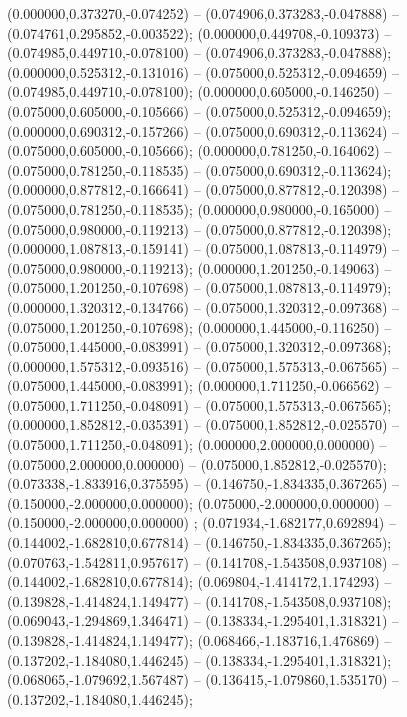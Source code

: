  (0.000000,0.373270,-0.074252) -- (0.074906,0.373283,-0.047888) -- (0.074761,0.295852,-0.003522);
 (0.000000,0.449708,-0.109373) -- (0.074985,0.449710,-0.078100) -- (0.074906,0.373283,-0.047888);
 (0.000000,0.525312,-0.131016) -- (0.075000,0.525312,-0.094659) -- (0.074985,0.449710,-0.078100);
 (0.000000,0.605000,-0.146250) -- (0.075000,0.605000,-0.105666) -- (0.075000,0.525312,-0.094659);
 (0.000000,0.690312,-0.157266) -- (0.075000,0.690312,-0.113624) -- (0.075000,0.605000,-0.105666);
 (0.000000,0.781250,-0.164062) -- (0.075000,0.781250,-0.118535) -- (0.075000,0.690312,-0.113624);
 (0.000000,0.877812,-0.166641) -- (0.075000,0.877812,-0.120398) -- (0.075000,0.781250,-0.118535);
 (0.000000,0.980000,-0.165000) -- (0.075000,0.980000,-0.119213) -- (0.075000,0.877812,-0.120398);
 (0.000000,1.087813,-0.159141) -- (0.075000,1.087813,-0.114979) -- (0.075000,0.980000,-0.119213);
 (0.000000,1.201250,-0.149063) -- (0.075000,1.201250,-0.107698) -- (0.075000,1.087813,-0.114979);
 (0.000000,1.320312,-0.134766) -- (0.075000,1.320312,-0.097368) -- (0.075000,1.201250,-0.107698);
 (0.000000,1.445000,-0.116250) -- (0.075000,1.445000,-0.083991) -- (0.075000,1.320312,-0.097368);
 (0.000000,1.575312,-0.093516) -- (0.075000,1.575313,-0.067565) -- (0.075000,1.445000,-0.083991);
 (0.000000,1.711250,-0.066562) -- (0.075000,1.711250,-0.048091) -- (0.075000,1.575313,-0.067565);
 (0.000000,1.852812,-0.035391) -- (0.075000,1.852812,-0.025570) -- (0.075000,1.711250,-0.048091);
 (0.000000,2.000000,0.000000) -- (0.075000,2.000000,0.000000) -- (0.075000,1.852812,-0.025570);
 (0.073338,-1.833916,0.375595) -- (0.146750,-1.834335,0.367265) -- (0.150000,-2.000000,0.000000);
 (0.075000,-2.000000,0.000000) -- (0.150000,-2.000000,0.000000) ;
 (0.071934,-1.682177,0.692894) -- (0.144002,-1.682810,0.677814) -- (0.146750,-1.834335,0.367265);
 (0.070763,-1.542811,0.957617) -- (0.141708,-1.543508,0.937108) -- (0.144002,-1.682810,0.677814);
 (0.069804,-1.414172,1.174293) -- (0.139828,-1.414824,1.149477) -- (0.141708,-1.543508,0.937108);
 (0.069043,-1.294869,1.346471) -- (0.138334,-1.295401,1.318321) -- (0.139828,-1.414824,1.149477);
 (0.068466,-1.183716,1.476869) -- (0.137202,-1.184080,1.446245) -- (0.138334,-1.295401,1.318321);
 (0.068065,-1.079692,1.567487) -- (0.136415,-1.079860,1.535170) -- (0.137202,-1.184080,1.446245);
